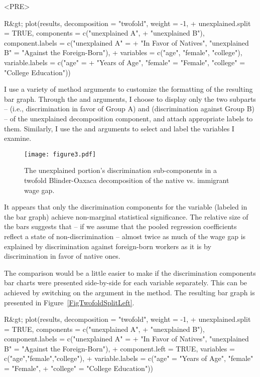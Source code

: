 <PRE>\documentclass[nojss]{jss}
\begin{document}
\begin{CodeInput}
R&gt; plot(results, decomposition = "twofold", weight = -1,
+    unexplained.split = TRUE, components = c("unexplained A", 
+    "unexplained B"), component.labels = c("unexplained A" = 
+    "In Favor of Natives", "unexplained B" = "Against the Foreign-Born"),
+    variables = c("age", "female", "college"), variable.labels = c("age" =
+    "Years of Age", "female" = "Female", "college" = "College Education"))
\end{CodeInput}

I use a variety of  method arguments to customize the formatting of the resulting bar graph. Through the  and  arguments, I choose to display only the two subparts --  (i.e., discrimination in favor of Group A) and  (discrimination against Group B) -- of the unexplained decomposition component, and attach appropriate labels to them. Similarly, I use the  and  arguments to select and label the variables I examine.

\begin{figure}[htp!]
	\centering
	\texttt{[image: figure3.pdf]}
	\caption{The unexplained portion's discrimination sub-components in a twofold Blinder-Oaxaca decomposition of the native vs. immigrant wage gap.}
	\label{FigTwofoldSplit}
\end{figure}

It appears that only the discrimination components for the  variable (labeled  in the bar graph) achieve non-marginal statistical significance. The relative size of the bars suggests that -- if we assume that the pooled regression coefficients reflect a state of non-discrimination -- almost twice as much of the wage gap is explained by discrimination against foreign-born workers as it is by discrimination in favor of native ones. 

The comparison would be a little easier to make if the discrimination components bar charts were presented side-by-side for each variable separately. This can be achieved by switching on the  argument in the  method. The resulting bar graph is presented in Figure~\ref{FigTwofoldSplitLeft}.

\begin{CodeInput}
R&gt; plot(results, decomposition = "twofold", weight = -1,
+    unexplained.split = TRUE, components = c("unexplained A", 
+    "unexplained B"), component.labels = c("unexplained A" = 
+    "In Favor of Natives", "unexplained B" = "Against the Foreign-Born"),
+    component.left = TRUE, variables = c("age","female","college"),
+    variable.labels = c("age" = "Years of Age", "female" = "Female",
+    "college" = "College Education"))
\end{CodeInput}
\end{document}
